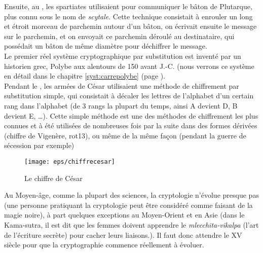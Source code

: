 Ensuite, au , les spartiates utilisaient pour communiquer le
bâton de Plutarque, plus connu sous le nom de \emph{scytale}. Cette
technique consistait à enrouler un long et étroit morceau de parchemin
autour d'un bâton, on écrivait ensuite le message sur le parchemin, et
on envoyait ce parchemin déroulé au destinataire, qui possédait un
bâton
de même diamètre pour déchiffrer le message. \\

Le premier réel système cryptographique par substitution est inventé
par un historien grec, Polybe aux alentours de 150 avant J.-C. (nous
verrons ce système en détail dans le chapitre \ref{syst:carrepolybe} (page
\pageref{syst:carrepolybe}). \\

\label{syst:chiffrecesar}
Pendant le , les armées de César utilisaient une méthode de
chiffrement par substitution simple, qui consistait à décaler les
lettres de l'alphabet d'un certain rang dans l'alphabet (de 3 rangs la
plupart du temps, ainsi A devient D, B devient E, \dots). Cette simple
méthode est une des méthodes de chiffrement les plus connues et à été
utilisées de nombreuses fois par la suite dans des formes dérivées (chiffre de
Vigenère, rot13), ou même
de la même façon (pendant la guerre de sécession par exemple)

\begin{figure}[h]
  \begin{center}
    \texttt{[image: eps/chiffrecesar]}
  \end{center}
  \caption{Le chiffre de César}
  \label{fig:chiffrecesar}
\end{figure}

Au Moyen-âge, comme la plupart des sciences, la cryptologie n'évolue
presque pas (une personne pratiquant la cryptologie peut être
considéré comme faisant de la magie noire), à part quelques exceptions
au Moyen-Orient et en Asie (dans le Kama-sutra, il est dit que les
femmes doivent apprendre le \emph{mlecchita-vikalpa} (l'art de
l'écriture secrète) pour cacher leurs liaisons.). Il faut donc
attendre le XV\ieme~ siècle pour que la cryptographie commence
réellement à évoluer. \\

